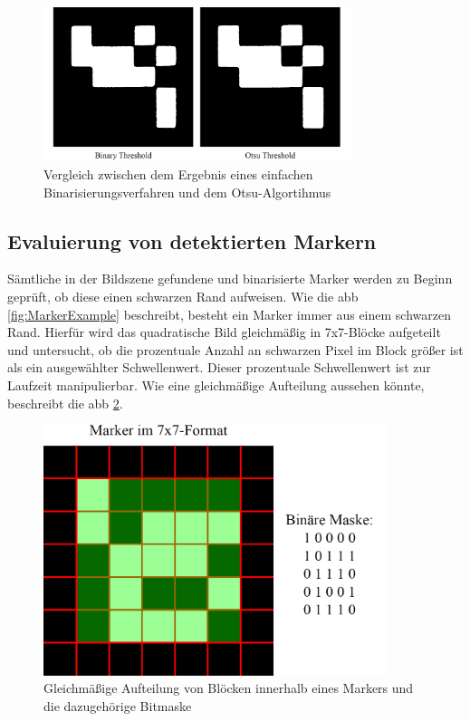 \begin{figure}[H]
\centering
\includegraphics[width=9cm]{Bilder/Implementierung/threshold_binary_otsu.png}
\caption{Vergleich zwischen dem Ergebnis eines einfachen Binarisierungsverfahren und dem Otsu-Algortihmus}
\label{fig:comparisonOtsubinary}
\end{figure}

\newpage

\subsection{Evaluierung von detektierten Markern}
Sämtliche in der Bildszene gefundene und binarisierte Marker werden zu Beginn geprüft, ob diese einen schwarzen Rand aufweisen. Wie die \acs{abb} \ref{fig:MarkerExample} beschreibt, besteht ein Marker immer aus einem schwarzen Rand. Hierfür wird das quadratische Bild gleichmäßig in 7x7-Blöcke aufgeteilt und untersucht, ob die prozentuale Anzahl an schwarzen Pixel im Block größer ist als ein ausgewählter Schwellenwert. Dieser prozentuale Schwellenwert ist zur Laufzeit manipulierbar. Wie eine gleichmäßige Aufteilung aussehen könnte, beschreibt die \acs{abb} \ref{fig:BlockSeparationMarker}.

\begin{figure}[H]
\centering
\includegraphics[width=10cm]{Bilder/Implementierung/marker_blocks.png}
\caption{Gleichmäßige Aufteilung von Blöcken innerhalb eines Markers und die dazugehörige Bitmaske}
\label{fig:BlockSeparationMarker}
\end{figure}

